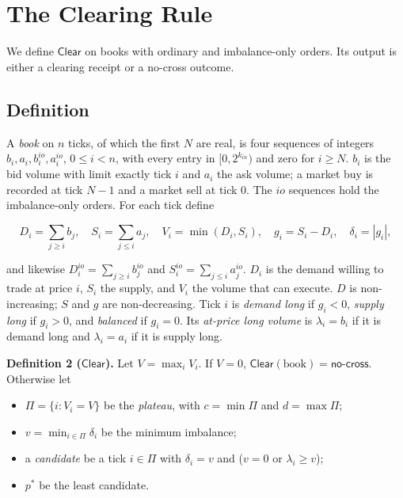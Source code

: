 

\section{The Clearing Rule}
\label{app:zq-clearing-rule}

We define \(\mathsf{Clear}\) on books with ordinary and imbalance-only orders. Its output is either a clearing receipt or a no-cross outcome.

\subsection{Definition}

A \emph{book} on \(n\) ticks, of which the first \(N\) are real, is four sequences of integers \(b_i, a_i, b^{io}_i, a^{io}_i\), \(0 \le i < n\), with every entry in \([0, 2^{k_{in}})\) and zero for \(i \ge N\). \(b_i\) is the bid volume with limit exactly tick \(i\) and \(a_i\) the ask volume; a market buy is recorded at tick \(N-1\) and a market sell at tick 0. The \(io\) sequences hold the imbalance-only orders. For each tick define

\[
D_i = \sum_{j \ge i} b_j, \quad
S_i = \sum_{j \le i} a_j, \quad
V_i = \min(D_i, S_i), \quad
g_i = S_i - D_i, \quad
\delta_i = |g_i|,
\]

and likewise \(D^{io}_i = \sum_{j \ge i} b^{io}_j\) and \(S^{io}_i = \sum_{j \le i} a^{io}_j\). \(D_i\) is the demand willing to trade at price \(i\), \(S_i\) the supply, and \(V_i\) the volume that can execute. \(D\) is non-increasing; \(S\) and \(g\) are non-decreasing. Tick \(i\) is \emph{demand long} if \(g_i < 0\), \emph{supply long} if \(g_i > 0\), and \emph{balanced} if \(g_i = 0\). Its \emph{at-price long volume} is \(\lambda_i = b_i\) if it is demand long and \(\lambda_i = a_i\) if it is supply long.

\textbf{Definition 2 (\(\mathsf{Clear}\)).} Let \(V = \max_i V_i\). If \(V = 0\), \(\mathsf{Clear}(\text{book}) = \textsf{no-cross}\). Otherwise let

\begin{itemize}
\item
  \(\Pi = \{i : V_i = V\}\) be the \emph{plateau}, with \(c = \min \Pi\) and \(d = \max \Pi\);
\item
  \(v = \min_{i \in \Pi} \delta_i\) be the minimum imbalance;
\item
  a \emph{candidate} be a tick \(i \in \Pi\) with \(\delta_i = v\) and (\(v = 0\) or \(\lambda_i \ge v\));
\item
  \(p^*\) be the least candidate.
\end{itemize}

